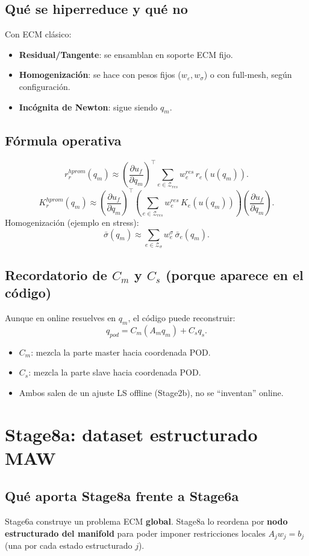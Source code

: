 \documentclass[11pt,a4paper]{article}
\begin{document}
\subsection{Qué se hiperreduce y qué no}
Con ECM clásico:
\begin{itemize}[leftmargin=1.5em]
\item \textbf{Residual/Tangente}: se ensamblan en soporte ECM fijo.
\item \textbf{Homogenización}: se hace con pesos fijos ($w_\varepsilon,w_\sigma$)
o con full-mesh, según configuración.
\item \textbf{Incógnita de Newton}: sigue siendo $q_m$.
\end{itemize}

\subsection{Fórmula operativa}
\[
r_r^{hprom}(q_m)\approx
\left(\frac{\partial u_f}{\partial q_m}\right)^\top
\sum_{e\in\mathcal Z_{res}} w^{res}_e\,r_e(u(q_m)).
\]
\[
K_r^{hprom}(q_m)\approx
\left(\frac{\partial u_f}{\partial q_m}\right)^\top
\left(\sum_{e\in\mathcal Z_{res}} w^{res}_e\,K_e(u(q_m))\right)
\left(\frac{\partial u_f}{\partial q_m}\right).
\]
Homogenización (ejemplo en stress):
\[
\bar{\sigma}(q_m)\approx\sum_{e\in\mathcal Z_{\sigma}} w^{\sigma}_e\,\bar{\sigma}_e(q_m).
\]

\subsection{Recordatorio de $C_m$ y $C_s$ (porque aparece en el código)}
Aunque en online resuelves en $q_m$, el código puede reconstruir:
\[
q_{pod}=C_m(A_m q_m)+C_s q_s.
\]
\begin{itemize}[leftmargin=1.5em]
\item $C_m$: mezcla la parte master hacia coordenada POD.
\item $C_s$: mezcla la parte slave hacia coordenada POD.
\item Ambos salen de un ajuste LS offline (Stage2b), no se ``inventan'' online.
\end{itemize}

\section{Stage8a: dataset estructurado MAW}
\subsection{Qué aporta Stage8a frente a Stage6a}
Stage6a construye un problema ECM \textbf{global}. Stage8a lo reordena por
\textbf{nodo estructurado del manifold} para poder imponer restricciones locales
$A_jw_j=b_j$ (una por cada estado estructurado $j$).
\end{document}
